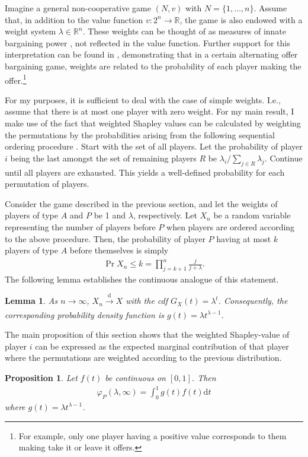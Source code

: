 \documentclass[a4paper]{article}
\newtheorem{proposition}{Proposition}
\newtheorem{lemma}{Lemma}
\newcommand{\dt}{\mathrm{d}t}
\begin{document}
Imagine a general non-cooperative game $(N, v)$ with $N = \{1, \dots, n\}$. Assume that, in addition to the value function $v : 2^n \to \mathbb{R}$, the game is also endowed with a weight system $\lambda \in \mathbb{R}^n$. These weights can be thought of as measures of innate bargaining power \parencite{shapley1953additive}, not reflected in the value function. Further support for this interpretation can be found in \textcite{hart1996bargaining}, demonstrating that in a certain alternating offer bargaining game, weights are related to the probability of each player making the offer.\footnote{For example, only one player having a positive value corresponds to them making take it or leave it offers.}

For my purposes, it is sufficient to deal with the case of simple weights. I.e., assume that there is at most one player with zero weight. For my main result, I make use of the fact that weighted Shapley values can be calculated by weighting the permutations by the probabilities arising from the following sequential ordering procedure \parencite{kalai1987weighted}. Start with the set of all players. Let the probability of player $i$ being the last amongst the set of remaining players $R$ be $\lambda_i / \sum_{j \in R} \lambda_j$. Continue until all players are exhausted. This yields a well-defined probability for each permutation of players.

Consider the game described in the previous section, and let the weights of players of type $A$ and $P$ be 1 and $\lambda$, respectively. Let $X_n$ be a random variable representing the number of players before $P$ when players are ordered according to the above procedure. Then, the probability of player $P$ having at most $k$ players of type $A$ before themselves is simply
\begin{align*}
    \Pr{X_n \leq k} = \prod_{j=k+1}^n \frac{j}{j + \lambda} .
\end{align*}
The following lemma establishes the continuous analogue of this statement.
\begin{lemma}
    \label{lem:entry_distr}
     As $n \to \infty$, $X_n \xrightarrow[]{\mathrm{d}} X$ with the cdf $G_X(t) = \lambda^t$. Consequently, the corresponding probability density function is $g(t) = \lambda t^{\lambda - 1}$.
\end{lemma}

The main proposition of this section shows that the weighted Shapley-value of player $i$ can be expressed as the expected marginal contribution of that player where the permutations are weighted according to the previous distribution.
\begin{proposition}
    \label{prop:one_sided_weighted}
    Let $f(t)$ be continuous on $[0, 1]$. Then
    \begin{align*}
        \varphi_P(\lambda, \infty) = \int_0^1 g(t) f(t) \dt
    \end{align*}
    where $g(t) = \lambda t^{\lambda - 1}$.
\end{proposition}
\end{document}
